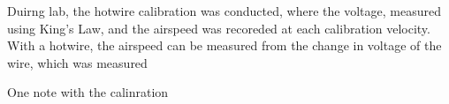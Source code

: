 \documentclass[a4paper,11pt]{texMemo}
\begin{document}
\maketitle

Duirng lab, the hotwire calibration was conducted, where the voltage, measured 
using King's Law, and the airspeed was recoreded at each calibration velocity. 
With a hotwire, the airspeed can be measured from the change in voltage of the
wire, which was measured

One note with the calinration 
\end{document}
